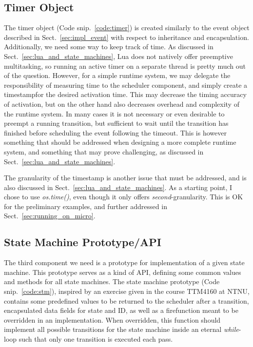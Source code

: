\subsection{Timer Object}
\label{sec:impl_timer}
The timer object (Code snip.~\ref{code:timer}) is created similarly to the event object described in Sect.~\ref{sec:impl_event} with respect to inheritance and encapsulation. Additionally, we need some way to keep track of time. As discussed in Sect.~\ref{sec:lua_and_state_machines}, Lua does not natively offer preemptive multitasking, so running an active timer on a separate thread is pretty much out of the question. However, for a simple runtime system, we may delegate the responsibility of measuring time to the scheduler component, and simply create a \guillemotleft timestamp\guillemotright  for the desired activation time. This may decrease the timing accuracy of activation, but on the other hand also decreases overhead and complexity of the runtime system. In many cases it is not necessary or even desirable to preempt a running transition, but sufficient to wait until the transition has finished before scheduling the event following the timeout. This is however something that should be addressed when designing a more complete runtime system, and something that may prove challenging, as discussed in Sect.~\ref{sec:lua_and_state_machines}.

The granularity of the timestamp is another issue that must be addressed, and is also discussed in Sect.~\ref{sec:lua_and_state_machines}. As a starting point, I chose to use \emph{os.time()}, even though it only offers \emph{second}-granularity. This is OK for the preliminary examples, and further addressed in Sect.~\ref{sec:running_on_micro}.

\subsection{State Machine Prototype/API}
\label{sec:impl_stm}
The third component we need is a prototype for implementation of a given state machine. This prototype serves as a kind of API, defining some common values and methods for all state machines. The state machine prototype (Code snip.~\ref{code:stm}), inspired by an exercise given in the course TTM4160 at NTNU, contains some predefined values to be returned to the scheduler after a transition, encapsulated data fields for state and ID, as well as a \guillemotleft fire\guillemotright  function meant to be overridden in an implementation. When overridden, this function should implement all possible transitions for the state machine inside an eternal \emph{while}-loop such that only one transition is executed each pass.

